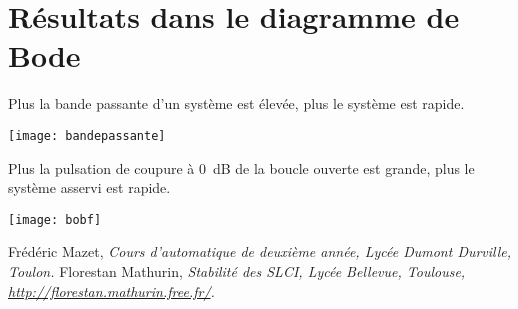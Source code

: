 \section{Résultats dans le diagramme de Bode}


\noindent\begin{minipage}[c]{.48\linewidth}
\begin{resultat}
Plus la bande passante d'un système est élevée, plus le système est rapide.
\end{resultat}

\begin{center}
\texttt{[image: bandepassante]}
\end{center}

\end{minipage} \hfill
\begin{minipage}[c]{.48\linewidth}
\begin{resultat}
Plus la pulsation de coupure à \SI{0}{dB} de la boucle ouverte est grande, plus le système asservi est rapide.
\end{resultat}


\begin{center}
\texttt{[image: bobf]}
\end{center}
\end{minipage}





\begin{thebibliography}{2}
    Frédéric Mazet, {\it Cours d'automatique de deuxième année, Lycée Dumont Durville, Toulon.}
       Florestan Mathurin, {\it Stabilité des SLCI, Lycée Bellevue, Toulouse, \url{http://florestan.mathurin.free.fr/}.}
\end{thebibliography}
